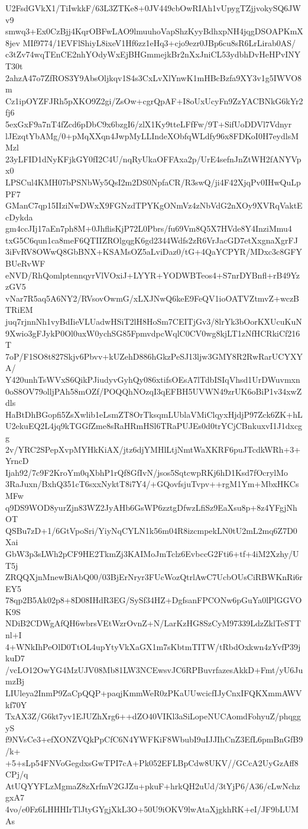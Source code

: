 U2FsdGVkX1/TiIwkkF/63L3ZTKe8+0JV449cbOwRIAh1vUpygTZjjvokySQ6JWv9
smwq3+Ex0CzBjj4KqrOBFwLAO9lmuuhoVapShzKyyBdhxpNH4jqgDSOAPKmX8jev
MIf9774/1EVFlShiyL8ixeV1Hf6zz1eHq3+cjo9ezr0JBp6cu8sR6LrLirab0AS/
c3tZv74wqTEnCE2nhYOdyWxEjBHGmmejkBr2nXxJniCL53ydbhDvHeHPvINYT30t
2ahzA47o7ZfROS3Y9AbsOljkqv1S4s3CxLvXlYnwK1mHBcBzfa9XY3v1g5IWVO8m
Cz1ipOYZFJRh5pXKO9Z2gi/ZsOw+cgrQpAF+I8oUxUcyFn9ZzYACBNkG6kYr2fj6
5exGxF9a7nT4fZcd6pDbC9x6bzgI6/zlX1Ky9tteLFfFw/9T+SifUoDDVl7Vdnyr
lJEzqtYbAMg/0+pMqXXqn4JwpMyLLIndeXObfqWLdfy96x8FDKoI0H7eydlsMMzl
23yLFID1dNyKFjkGY0fI2C4U/nqRyUkaOFFAxa2p/UrE4sefnJnZtWH2fANYVpx0
LPSCul4KMH07bPSNbWy5QsI2m2DS0NpfaCR/R3swQ/ji4F42XjqPv0IHwQuLpPF7
GManC7qp15IIziNwDWxX9FGNzdTPYKgONmVz4zNbVdG2nXOy9XVRqVaktEcDykda
gm4ccJIj17aEn7ph8M+0JhflisKjP72L0Pbrs/fu69Vm8Q5X7HVde8Y4InziMmu4
txG5C6qun1ca8meF6QTIIZROlgqgK6gd2344Wdfs2zR6VrJacGD7etXxgnaXgrFJ
3iFvRV8OWwQ8GbBNX+KSAMsOZ5aLviDaz0/tG+4QaYCPYR/MDxc3c8GFYBUeRvWF
eNVD/RhQomlptennqyrVlVOxiJ+LYYR+YODWBTeos4+S7nrDYBnfl+rB49YzzGV5
vNar7R5aq5A6NY2/RVsovOwmG/xLXJNwQ6keE9FeQV1ioOATVZtmvZ+wczBTRiEM
juq7rjnnNh1vyBdIieVLUadwHSiT2lH8HoSm7CEITjGv3/8lrYk3bOorKXUcuKuN
9Xwio3gFJykP0Ol0uxW0ychSG85FpmvdpcWqlC0CV0wg8kjLT1zNfHCRkiCf216T
7oP/F1SO8t827Skjv6Pbvv+kUZehD886hGkzPeSJ13ljw3GMY8R2RwRarUCYXYA/
Y420unhTsWVxS6QikPJiudyvGyhQy086xtifsOEsA7lTdbISIqVhsd1UrDWuvmxn
0oS8OV79olljPAh58mOZf/POQQhNOzqI3qEFBH5UVWN49zrUK6oBiP1v34xwZdls
HaBtDhBGopfi5ZsXwlib1eLsmZT8OrTksqmLUblaVMiClqyxHjdjP97Zck6ZK+hL
U2ekuEQ2L4jq9kTGGfZme8sRaHRmHSl6TRaPUJEs0d0trYCjCBnkuxvI1J1dxcgg
2v/YRC2SPepXvpMYHkKiAX/jtz6djYMHlLtjNmtWaXKRF6puJTcdkWRh+3+YrncD
Ijah92/7c9F2KroYm0qXbhP1rQf8GfIvN/jsos5SqtcwpRKj6hD1Ksd7fOcrylMo
3RaJuxn/BxhQ351cT6sxxNyktT8i7Y4/+GQovfsjuTvpv++rgM1Ym+MbxHKCsMFw
q9DS9WOD8yurZjn83WZ2JyAHb6GsWP6zztgDfwzLfiSz9EaXsu8p+8z4YFgjNhOT
QSBu7zD+1/6GtVpoSri/YiyNqCYLN1k56m04R8izcmpekLN0tU2mL2mq6Z7D0Xai
GbW3p3sLWh2pCF9HE2TkmZj3KAIMoJmTclz6EvbccG2Fti6+tf+4iM2Xzhy/UT5j
ZRQQXjnMnewBiAbQ00/03BjErNryr3FUcWozQtrlAwC7UcbOUsCiRBWKnRi6rEY5
78qp2B5Ak02p8+8D08IHdR3EG/SySf34HZ+DgfsanFPCONw6pGuYa0lPlGGVOK9S
NDiB2CDWgAfQH6wbrsVEtWzrOvnZ+N/LarKzHG8SzCyM97339LdzZklTeSTTnl+I
4+WNkIhPeOlD0TtOL4upYtyVkXaGX1m7sKbtmTITW/tRbdOxkwn4zYvfP39jkuD7
/vcLO12OwYG4MzUJV08Mb81LW3NCEwsvJC6RPBuvrfazesAkkD+Fmt/yU6JumzBj
LIUleya2InmP9ZaCpQQP+paqjKmmWeR0zPKaUUwcicfIJyCnxIFQKXmmAWVkf70Y
TxAX3Z/G6kt7yv1EJUZhXrg6++dZO40VIKl3aSiLopeNUCAomdFohyuZ/phqggyS
f9NVsCe3+efXONZVQkPpCfC6N4YWFKiF8WbubI9uIJJIhCnZ3EfL6pmBnGfB9/k+
+5+sLp54FNVoGegdxsGwTPI7cA+Pk052EFLBpCdw8UKV//GCcA2UyGzAff8CPj/q
AtUQYYFLzMgmaZ8zXrfmV2GJZu+pkuF+hrkQH2uUd/3tYjP6/A36/cLwNchzgxA7
4vo/e0Fz6LHHHIrTlJtyGYgjXkL3O+50U9iOKV9lwAtaXjgkhRK+eI/JF9bLUMAs
